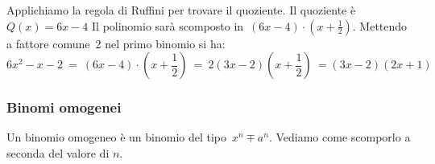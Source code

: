Applichiamo la regola di Ruffini per trovare il quoziente. 
Il quoziente è~$Q(x)=6x-4$
Il polinomio sarà scomposto in~$(6x-4)\cdot\left(x+\frac{1}{2}\right)$.
Mettendo a fattore comune~2 nel primo binomio si ha:
\[6x^{2}-x-2\ =
\ (6x-4)\cdot \left(x+\frac{1}{2}\right)\ =
\ 2(3x-2)\left(x+\frac{1}{2}\right)\ =(3x-2)(2x+1)\]





\subsubsection{Binomi omogenei}
\label{subsubsec:divpol_binomo}

Un binomio omogeneo è un binomio del tipo~$x^{n} \mp a^{n}$.
Vediamo come scomporlo a seconda del valore di $n$.

